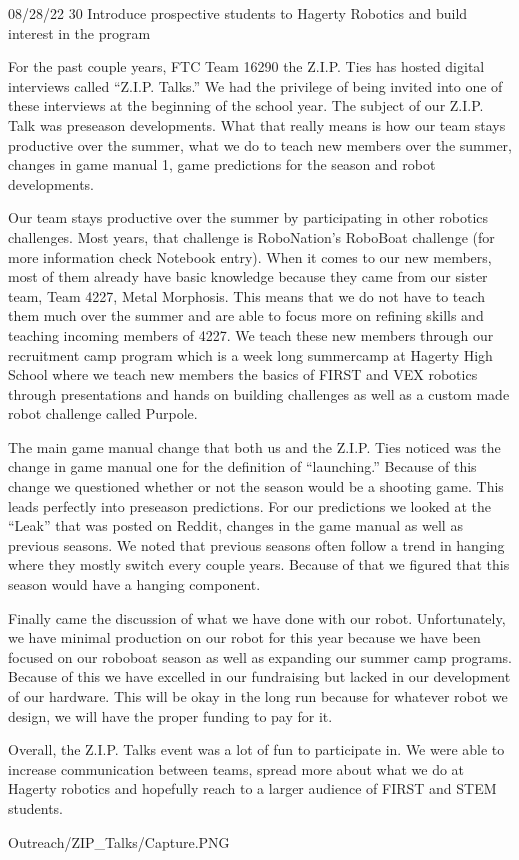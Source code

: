 {08/28/22}
{30}
{Introduce prospective students to Hagerty Robotics and build interest in the program} 
{
For the past couple years, FTC Team 16290 the Z.I.P. Ties has hosted digital interviews called “Z.I.P. Talks.” We had the privilege of being invited into one of these interviews at the beginning of the school year. The subject of our Z.I.P. Talk was preseason developments. What that really means is how our team stays productive over the summer, what we do to teach new members over the summer, changes in game manual 1, game predictions for the season and robot developments. 

Our team stays productive over the summer by participating in other robotics challenges. Most years, that challenge is RoboNation’s RoboBoat challenge (for more information check Notebook entry). 
When it comes to our new members, most of them already have basic knowledge because they came from our sister team, Team 4227, Metal Morphosis. This means that we do not have to teach them much over the summer and are able to focus more on refining skills and teaching incoming members of 4227. We teach these new members through our recruitment camp program which is a week long summercamp at Hagerty High School where we teach new members the basics of FIRST and VEX robotics through presentations and hands on building challenges as well as a custom made robot challenge called Purpole. 

The main game manual change that both us and the Z.I.P. Ties noticed was the change in game manual one for the definition of “launching.” Because of this change we questioned whether or not the season would be a shooting game. This leads perfectly into preseason predictions. For our predictions we looked at the “Leak” that was posted on Reddit, changes in the game manual as well as previous seasons. We noted that previous seasons often follow a trend in hanging where they mostly switch every couple years. Because of that we figured that this season would have a hanging component.

Finally came the discussion of what we have done with our robot. Unfortunately, we have minimal production on our robot for this year because we have been focused on our roboboat season as well as expanding our summer camp programs. Because of this we have excelled in our fundraising but lacked in our development of our hardware. This will be okay in the long run because for whatever robot we design, we will have the proper funding to pay for it.

Overall, the Z.I.P. Talks event was a lot of fun to participate in. We were able to increase communication between teams, spread more about what we do at Hagerty robotics and hopefully reach to a larger audience of FIRST and STEM students.


} 

{Outreach/ZIP_Talks/Capture.PNG}